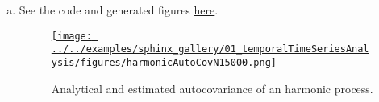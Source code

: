 \documentclass[12pt]{article}
\begin{document}
\begin{enumerate}[(a)]
    \item See the code and generated figures
        \href{https://joacorapela.github.io/statNeuro2025/auto_examples/01_temporalTimeSeriesAnalysis/plot_harmonicAutocovariance.html#sphx-glr-auto-examples-01-temporaltimeseriesanalysis-plot-harmonicautocovariance-py}{here}.

        \begin{figure}
            \begin{center}
                \href{https://www.gatsby.ucl.ac.uk/~rapela/statNeuro/2025/lectures/01_temporalTimeSeriesAnalysis/figures/harmonicAutoCovN15000.html}{\texttt{[image: ../../examples/sphinx\_gallery/01\_temporalTimeSeriesAnalysis/figures/harmonicAutoCovN15000.png]}}
                \caption{Analytical and estimated autocovariance of an harmonic process.}
                \label{fig:harmonicProcessAutocovariance}
            \end{center}
        \end{figure}

\end{enumerate}
\end{document}
